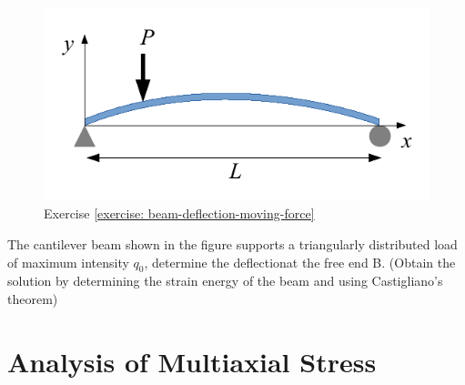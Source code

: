\documentclass[
10pt,
a4paper,
openany,
svgnames,
]{book} %
\newcommand{\exercise}{%
\item\label{lab:\arabic{chapter}.\arabic{exercisesi}}  %
}
\begin{document}
\begin{exercises}
  \begin{figure}[h]
    \centering
    \includegraphics[scale=0.95]{pictures/Static-body-load-analysis/beam-def-moving-force-exercise}
    \caption[]{Exercise \ref{exercise: beam-deflection-moving-force}}
  \end{figure}
  
  \exercise The cantilever beam shown in the figure supports a triangularly distributed load of maximum intensity $q_0$, determine the deflectionat the free end B. (Obtain the solution by determining the strain energy of the beam and using Castigliano’s theorem)

    \begin{figure}[H]
    \centering
  \end{figure}
  
\end{exercises}


\chapter{Analysis of Multiaxial Stress} \label{chapter: multiaxial stress}
\end{document}
